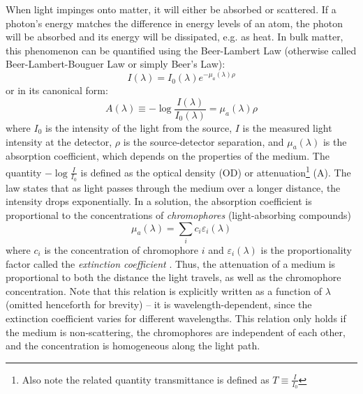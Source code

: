 When light impinges onto matter, it will either be absorbed or scattered. If a photon's energy matches the difference in energy levels of an atom, the photon will be absorbed and its energy will be dissipated, e.g. as heat. In bulk matter, this phenomenon can be quantified using the Beer-Lambert Law (otherwise called Beer-Lambert-Bouguer Law or simply Beer's Law):
\begin{equation} \label{eq:beer-lambert}
I(\lambda) = I_0(\lambda)e^{-\mu_a(\lambda) \rho}
\end{equation}
or in its canonical form:
\begin{equation}
A(\lambda) \equiv -\log\frac{I(\lambda)}{I_0(\lambda)} = \mu_a(\lambda)\rho
\end{equation}
where $I_0$ is the intensity of the light from the source, $I$ is the measured light intensity at the detector, $\rho$ is the source-detector separation, and $\mu_a(\lambda)$ is the absorption coefficient, which depends on the properties of the medium. The quantity $-\log\frac{I}{I_0}$ is defined as the optical density (OD) or attenuation\footnote{Also note the related quantity transmittance is defined as $T \equiv \frac{I}{I_0}$} (A). The law states that as light passes through the medium over a longer distance, the intensity drops exponentially. In a solution, the absorption coefficient is proportional to the concentrations of \emph{chromophores} (light-absorbing compounds)
\begin{equation} \label{eq:muA_sum_chromo}
\mu_a(\lambda) = \sum_i c_i \varepsilon_i(\lambda)
\end{equation}
where $c_i$ is the concentration of chromophore $i$ and $\varepsilon_i(\lambda)$ is the proportionality factor called the \emph{extinction coefficient} \cite[ch. 8.2.1]{Handbook}. Thus, the attenuation of a medium is proportional to both the distance the light travels, as well as the chromophore concentration. Note that this relation is explicitly written as a function of $\lambda$ (omitted henceforth for brevity) -- it is wavelength-dependent, since the extinction coefficient varies for different wavelengths. This relation only holds if the medium is non-scattering, the chromophores  are independent of each other, and the concentration is homogeneous along the light path. \cite[ch. 2]{Madsen2013}


